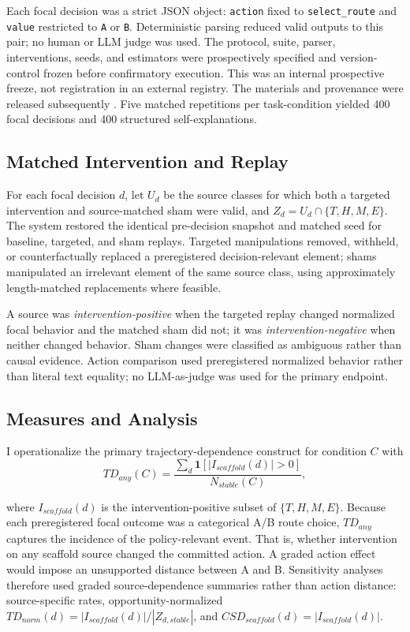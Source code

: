 \documentclass[conference]{IEEEtran}
\begin{document}
Each focal decision was a strict JSON object: \texttt{action} fixed to \texttt{select\_route} and \texttt{value} restricted to \texttt{A} or \texttt{B}. Deterministic parsing reduced valid outputs to this pair; no human or LLM judge was used. The protocol, suite, parser, interventions, seeds, and estimators were prospectively specified and version-control frozen before confirmatory execution. This was an internal prospective freeze, not registration in an external registry. The materials and provenance were released subsequently \cite{b21}. Five matched repetitions per task-condition yielded 400 focal decisions and 400 structured self-explanations.

\subsection{Matched Intervention and Replay}
For each focal decision $d$, let $U_d$ be the source classes for which both a targeted intervention and source-matched sham were valid, and $Z_d=U_d\cap\{T,H,M,E\}$. The system restored the identical pre-decision snapshot and matched seed for baseline, targeted, and sham replays. Targeted manipulations removed, withheld, or counterfactually replaced a preregistered decision-relevant element; shams manipulated an irrelevant element of the same source class, using approximately length-matched replacements where feasible.

A source was \emph{intervention-positive} when the targeted replay changed normalized focal behavior and the matched sham did not; it was \emph{intervention-negative} when neither changed behavior. Sham changes were classified as ambiguous rather than causal evidence. Action comparison used preregistered normalized behavior rather than literal text equality; no LLM-as-judge was used for the primary endpoint.

\subsection{Measures and Analysis}
I operationalize the primary trajectory-dependence construct for condition $C$ with
\begin{equation}
TD_{any}(C)=\frac{\sum_d \mathbf{1}[|I_{scaffold}(d)|>0]}{N_{stable}(C)},
\label{eq:tdany}
\end{equation}

where $I_{scaffold}(d)$ is the intervention-positive subset of $\{T,H,M,E\}$. Because each preregistered focal outcome was a categorical A/B route choice, $TD_{any}$ captures the incidence of the policy-relevant event. That is, whether intervention on any scaffold source changed the committed action. A graded action effect would impose an unsupported distance between A and B. Sensitivity analyses therefore used graded source-dependence summaries rather than action distance: source-specific rates, opportunity-normalized $TD_{norm}(d)=|I_{scaffold}(d)|/|Z_{d,stable}|$, and $CSD_{scaffold}(d)=|I_{scaffold}(d)|$.
\end{document}

